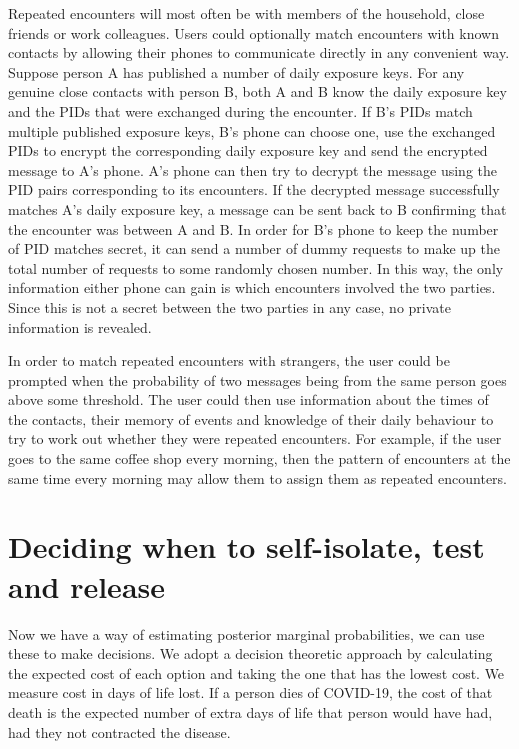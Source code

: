 \documentclass{article}
\begin{document}
Repeated encounters will most often be with members of the household, close friends or work colleagues. Users could optionally match encounters with known contacts by allowing their phones to communicate directly in any convenient way. Suppose person A has published a number of daily exposure keys. For any genuine close contacts with person B, both A and B know the daily exposure key and the PIDs that were exchanged during the encounter. If B's PIDs match multiple published exposure keys, B's phone can choose one, use the exchanged PIDs to encrypt the corresponding daily exposure key and send the encrypted message to A's phone. A's phone can then try to decrypt the message using the PID pairs corresponding to its encounters. If the decrypted message successfully matches A's daily exposure key, a message can be sent back to B confirming that the encounter was between A and B. In order for B's phone to keep the number of PID matches secret, it can send a number of dummy requests to make up the total number of requests to some randomly chosen number. In this way, the only information either phone can gain is which encounters involved the two parties. Since this is not a secret between the two parties in any case, no private information is revealed.

In order to match repeated encounters with strangers, the user could be prompted when the probability of two messages being from the same person goes above some threshold. The user could then use information about the times of the contacts, their memory of events and knowledge of their daily behaviour to try to work out whether they were repeated encounters. For example, if the user goes to the same coffee shop every morning, then the pattern of encounters at the same time every morning may allow them to assign them as repeated encounters.


\section{Deciding when to self-isolate, test and release}
Now we have a way of estimating posterior marginal probabilities, we can use these to make decisions. We adopt a decision theoretic approach by calculating the expected cost of each option and taking the one that has the lowest cost. We measure cost in days of life lost. If a person dies of COVID-19, the cost of that death is the expected number of extra days of life that person would have had, had they not contracted the disease.
\end{document}
